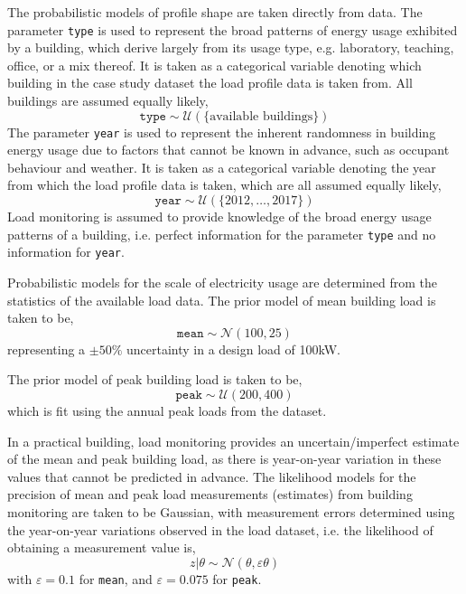The probabilistic models of profile shape are taken directly from data. The parameter \texttt{type} is used to represent the broad patterns of energy usage exhibited by a building, which derive largely from its usage type, e.g. laboratory, teaching, office, or a mix thereof. It is taken as a categorical variable denoting which building in the case study dataset the load profile data is taken from. All buildings are assumed equally likely,
\begin{equation} \label{eqn:id-model}
    \texttt{type} \sim \mathcal{U}\left(\lbrace \text{available buildings} \rbrace\right)
\end{equation}
The parameter \texttt{year} is used to represent the inherent randomness in building energy usage due to factors that cannot be known in advance, such as occupant behaviour and weather. It is taken as a categorical variable denoting the year from which the load profile data is taken, which are all assumed equally likely,
\begin{equation} \label{eqn:year-model}
    \texttt{year} \sim \mathcal{U}\left(\lbrace 2012,\ldots,2017 \rbrace\right)
\end{equation}
Load monitoring is assumed to provide knowledge of the broad energy usage patterns of a building, i.e. perfect information for the parameter \texttt{type} and no information for \texttt{year}.

Probabilistic models for the scale of electricity usage are determined from the statistics of the available load data. The prior model of mean building load is taken to be,
\begin{equation} \label{eqn:mean-model}
    \texttt{mean} \sim \mathcal{N}(100,25)
\end{equation}
representing a $\pm50\%$ uncertainty in a design load of 100kW.

The prior model of peak building load is taken to be,
\begin{equation} \label{eqn:peak-model}
    \texttt{peak} \sim \mathcal{U}(200,400)
\end{equation}
which is fit using the annual peak loads from the dataset.

In a practical building, load monitoring provides an uncertain/imperfect estimate of the mean and peak building load, as there is year-on-year variation in these values that cannot be predicted in advance. The likelihood models for the precision of mean and peak load measurements (estimates) from building monitoring are taken to be Gaussian, with measurement errors determined using the year-on-year variations observed in the load dataset, i.e. the likelihood of obtaining a measurement value is,
\begin{equation}
    z|\theta \sim \mathcal{N}(\theta,\varepsilon\theta)
\end{equation}
with $\varepsilon = 0.1$ for \texttt{mean}, and $\varepsilon = 0.075$ for \texttt{peak}.\\

